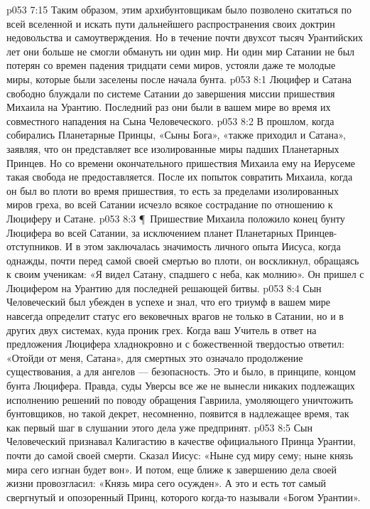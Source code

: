 \vs p053 7:15 Таким образом, этим архибунтовщикам было позволено скитаться по всей вселенной и искать пути дальнейшего распространения своих доктрин недовольства и самоутверждения. Но в течение почти двухсот тысяч Урантийских лет они больше не смогли обмануть ни один мир. Ни один мир Сатании не был потерян со времен падения тридцати семи миров, устояли даже те молодые миры, которые были заселены после начала бунта.
\vs p053 8:1 Люцифер и Сатана свободно блуждали по системе Сатании до завершения миссии пришествия Михаила на Урантию. Последний раз они были в вашем мире во время их совместного нападения на Сына Человеческого.
\vs p053 8:2 В прошлом, когда собирались Планетарные Принцы, «Сыны Бога», «также приходил и Сатана», заявляя, что он представляет все изолированные миры падших Планетарных Принцев. Но со времени окончательного пришествия Михаила ему на Иерусеме такая свобода не предоставляется. После их попыток совратить Михаила, когда он был во плоти во время пришествия, то есть за пределами изолированных миров греха, во всей Сатании исчезло всякое сострадание по отношению к Люциферу и Сатане.
\vs p053 8:3 \P\ Пришествие Михаила положило конец бунту Люцифера во всей Сатании, за исключением планет Планетарных Принцев\hyp{}отступников. И в этом заключалась значимость личного опыта Иисуса, когда однажды, почти перед самой своей смертью во плоти, он воскликнул, обращаясь к своим ученикам: «Я видел Сатану, спадшего с неба, как молнию». Он пришел с Люцифером на Урантию для последней решающей битвы.
\vs p053 8:4 Сын Человеческий был убежден в успехе и знал, что его триумф в вашем мире навсегда определит статус его вековечных врагов не только в Сатании, но и в других двух системах, куда проник грех. Когда ваш Учитель в ответ на предложения Люцифера хладнокровно и с божественной твердостью ответил: «Отойди от меня, Сатана», для смертных это означало продолжение существования, а для ангелов --- безопасность. Это и было, в принципе, концом бунта Люцифера. Правда, суды Уверсы все же не вынесли никаких подлежащих исполнению решений по поводу обращения Гавриила, умоляющего уничтожить бунтовщиков, но такой декрет, несомненно, появится в надлежащее время, так как первый шаг в слушании этого дела уже предпринят.
\vs p053 8:5 Сын Человеческий признавал Калигастию в качестве официального Принца Урантии, почти до самой своей смерти. Сказал Иисус: «Ныне суд миру сему; ныне князь мира сего изгнан будет вон». И потом, еще ближе к завершению дела своей жизни провозгласил: «Князь мира сего осужден». А это и есть тот самый свергнутый и опозоренный Принц, которого когда\hyp{}то называли «Богом Урантии».
